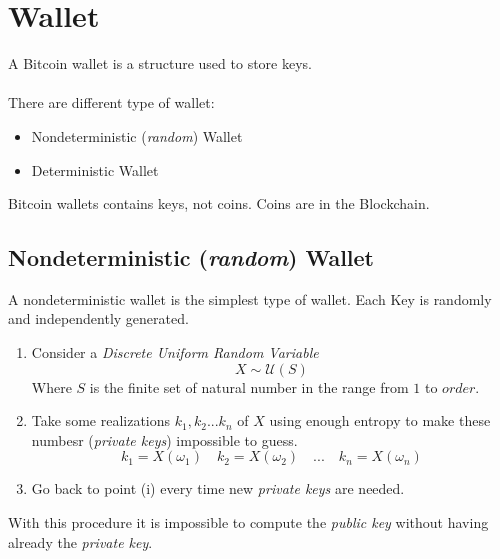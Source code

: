 
\chapter{Wallet} %

\label{wallet} %





A Bitcoin wallet is a structure used to store keys. \\ \\
There are different type of wallet:
\begin{itemize}
	\item Nondeterministic (\textit{random}) Wallet
	\item Deterministic Wallet
\end{itemize}

\begin{remark}
	Bitcoin wallets contains keys, not coins. Coins are in the Blockchain.
\end{remark}

\section{Nondeterministic (\textit{random}) Wallet}
A nondeterministic wallet is the simplest type of wallet. Each Key is randomly and independently generated.

\begin{enumerate}[label=(\roman*)]
	\item Consider a \textit{Discrete Uniform Random Variable}
	\begin{equation*}
		X\sim \mathcal{U}(S)
	\end{equation*}
	Where $S$ is the finite set of natural number in the range from $1$ to $order$.
	\item Take some realizations $k_1,k_2...k_n$ of $X$ using enough entropy to make these numbesr (\textit{private keys}) impossible to guess.
	\begin{equation*}
		k_1=X(\omega_1) \quad  k_2=X(\omega_2) \quad ... \quad k_n=X(\omega_n)
	\end{equation*}
	\item Go back to point (i) every time new \textit{private keys} are needed.
\end{enumerate}
With this procedure it is impossible to compute the \textit{public key} without having already the \textit{private key}.

